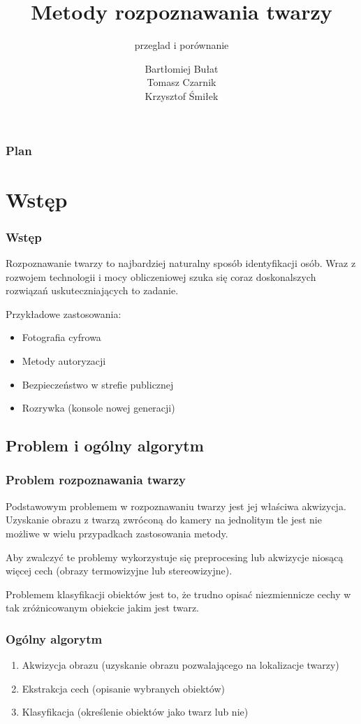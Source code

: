 \documentclass[xcolor=table]{beamer}
\title{Metody rozpoznawania twarzy}
\subtitle{przeglad i porównanie}
\author{Bartłomiej Bułat\\
Tomasz Czarnik\\
Krzysztof Śmiłek\\}
\begin{document}
\begin{frame}
  \titlepage
\end{frame}


\begin{frame}
  \frametitle{Plan}
  \tableofcontents
\end{frame}


\section{Wstęp}

\begin{frame}
  \frametitle{Wstęp}
  Rozpoznawanie twarzy to najbardziej naturalny sposób identyfikacji osób. Wraz z rozwojem technologii i mocy obliczeniowej szuka się coraz doskonalszych rozwiązań uskuteczniających to zadanie.\\[\baselineskip]
 {Przykładowe zastosowania:
\begin{itemize}
\item Fotografia cyfrowa
\item Metody autoryzacji
\item Bezpieczeństwo w strefie publicznej
\item Rozrywka (konsole nowej generacji)
\end{itemize}}
\end{frame}

\subsection{Problem i ogólny algorytm}
\begin{frame}
\frametitle{Problem rozpoznawania twarzy}

Podstawowym problemem w rozpoznawaniu twarzy jest jej właściwa akwizycja. Uzyskanie obrazu z twarzą zwróconą do kamery na jednolitym tle jest nie możliwe w wielu przypadkach zastosowania metody.
\pause

Aby zwalczyć te problemy wykorzystuje się preprocesing lub akwizycje niosącą więcej cech (obrazy termowizyjne lub stereowizyjne).
\pause

Problemem klasyfikacji obiektów jest to, że trudno opisać niezmiennicze cechy w tak zróżnicowanym obiekcie jakim jest twarz.   

\end{frame}

\begin{frame}
  \frametitle{Ogólny algorytm}

\begin{enumerate}
\item Akwizycja obrazu (uzyskanie obrazu pozwalającego na lokalizacje twarzy) \pause
\item Ekstrakcja cech (opisanie wybranych obiektów) \pause
\item Klasyfikacja (określenie obiektów jako twarz lub nie)
\end{enumerate}
   
\end{frame}
\end{document}
